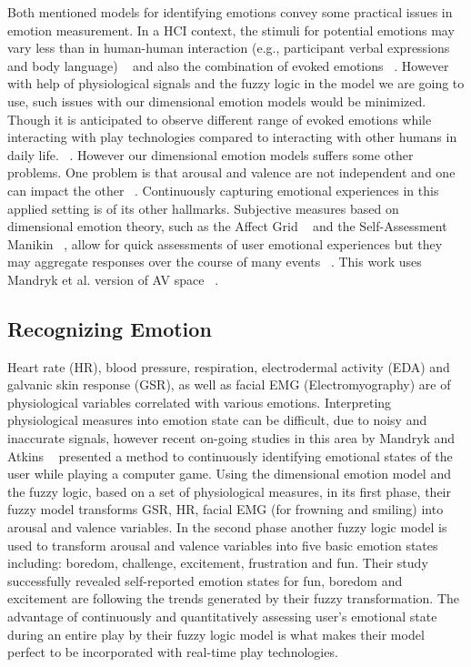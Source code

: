 \documentclass[conference]{IEEEtran}
\begin{document}
Both mentioned models for identifying emotions convey some practical issues in emotion measurement. In a HCI context, the stimuli for potential emotions may vary less than in human-human interaction (e.g., participant verbal expressions and body language) ~\cite{zhang2010service} and also the combination of evoked emotions ~\cite{peter2006emotion}. However with help of physiological signals and the fuzzy logic in the model we are going to use, such issues with our dimensional emotion models would be minimized. Though it is anticipated to observe different range of evoked emotions while interacting with play technologies compared to interacting with other humans in daily life. ~\cite{zhang2010service}. However our dimensional emotion models suffers some other problems. One problem is that arousal and valence are not independent and one can impact the other ~\cite{mandryk2007fuzzy}. Continuously capturing emotional experiences in this applied setting is of its other hallmarks. Subjective measures based on dimensional emotion theory, such as the Affect Grid ~\cite{russell1989affect} and the Self-Assessment Manikin ~\cite{bradley1994measuring}, allow for quick assessments of user emotional experiences but they may aggregate responses over the course of many events ~\cite{zhang2010service}. This work uses Mandryk et al. version of AV space ~\cite{mandryk2007fuzzy}. 

\subsection{Recognizing Emotion}

Heart rate (HR), blood pressure, respiration, electrodermal activity (EDA) and galvanic skin response (GSR), as well as facial EMG (Electromyography) are of physiological variables correlated with various emotions. Interpreting physiological measures into emotion state can be difficult, due to noisy and inaccurate signals, however recent on-going studies in this area by Mandryk and Atkins ~\cite{mandryk2007fuzzy} presented a method to continuously identifying emotional states of the user while playing a computer game. Using the dimensional emotion model and the fuzzy logic, based on a set of physiological measures, in its first phase, their fuzzy model transforms GSR, HR, facial EMG (for frowning and smiling) into arousal and valence variables. In the second phase another fuzzy logic model is used to transform arousal and valence variables into five basic emotion states including: boredom, challenge, excitement, frustration and fun. Their study successfully revealed self-reported emotion states for fun, boredom and excitement are following the trends generated by their fuzzy transformation. The advantage of continuously and quantitatively assessing user's emotional state during an entire play by their fuzzy logic model is what makes their model perfect to be incorporated with real-time play technologies.
\end{document}
